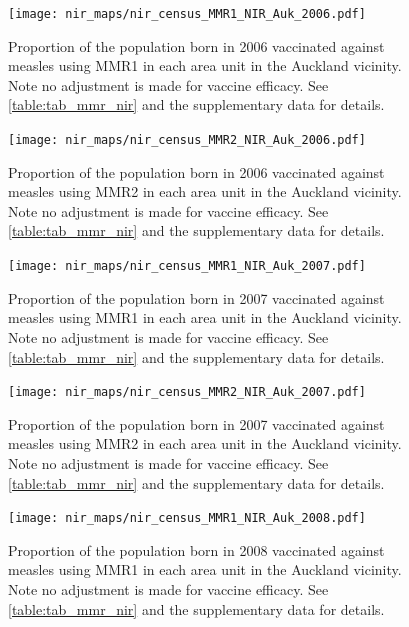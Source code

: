 \documentclass{article}
\begin{document}
% 
\begin{figure}
   \begin{center}
    \texttt{[image: nir\_maps/nir\_census\_MMR1\_NIR\_Auk\_2006.pdf]}
    \end{center}
    \caption{Proportion of the population born in 2006 vaccinated against measles using MMR1 in each area unit in the Auckland vicinity. Note no adjustment is made for vaccine efficacy. See \autoref{table:tab_mmr_nir} and the supplementary data for details.}
\label{fig:fig12006_a}
\end{figure}
% 
\begin{figure}
\begin{center}
\texttt{[image: nir\_maps/nir\_census\_MMR2\_NIR\_Auk\_2006.pdf]}
\end{center}
    \caption{Proportion of the population born in 2006 vaccinated against measles using MMR2 in each area unit in the Auckland vicinity. Note no adjustment is made for vaccine efficacy. See \autoref{table:tab_mmr_nir} and the supplementary data for details.}
\label{fig:fig22006_a}
\end{figure}
% 
% 
\begin{figure}
\begin{center}
\texttt{[image: nir\_maps/nir\_census\_MMR1\_NIR\_Auk\_2007.pdf]}
\end{center}
    \caption{Proportion of the population born in 2007 vaccinated against measles using MMR1 in each area unit in the Auckland vicinity. Note no adjustment is made for vaccine efficacy. See \autoref{table:tab_mmr_nir} and the supplementary data for details.}
\label{fig:fig12007_a}
\end{figure}
% 
% 
\begin{figure}
\begin{center}
    \texttt{[image: nir\_maps/nir\_census\_MMR2\_NIR\_Auk\_2007.pdf]}
\end{center}
    \caption{Proportion of the population born in 2007 vaccinated against measles using MMR2 in each area unit in the Auckland vicinity. Note no adjustment is made for vaccine efficacy. See \autoref{table:tab_mmr_nir} and the supplementary data for details.}
\label{fig:fig22007_a}
\end{figure}

% 
\begin{figure}
\begin{center}
    \texttt{[image: nir\_maps/nir\_census\_MMR1\_NIR\_Auk\_2008.pdf]}
\end{center}
    \caption{Proportion of the population born in 2008 vaccinated against measles using MMR1 in each area unit in the Auckland vicinity. Note no adjustment is made for vaccine efficacy. See \autoref{table:tab_mmr_nir} and the supplementary data for details.}
\label{fig:fig12008_a}
\end{figure}
\end{document}
